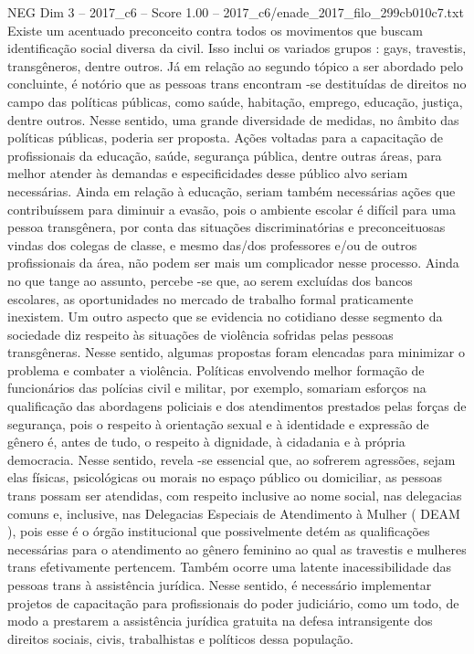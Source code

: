\begin{textsample}{NEG Dim 3 – 2017\_c6 – Score 1.00 – 2017\_c6/enade\_2017\_filo\_299cb010c7.txt}
Existe um acentuado preconceito contra todos os movimentos que buscam identificação social diversa da civil.
Isso inclui os variados grupos : gays, travestis, transgêneros, dentre outros.
Já em relação ao segundo tópico a ser abordado pelo concluinte, é notório que as pessoas trans encontram -se destituídas de direitos no campo das políticas públicas, como saúde, habitação, emprego, educação, justiça, dentre outros.
Nesse sentido, uma grande diversidade de medidas, no âmbito das políticas públicas, poderia ser proposta.
Ações voltadas para a capacitação de profissionais da educação, saúde, segurança pública, dentre outras áreas, para melhor atender às demandas e especificidades desse público alvo seriam necessárias.
Ainda em relação à educação, seriam também necessárias ações que contribuíssem para diminuir a evasão, pois o ambiente escolar é difícil para uma pessoa transgênera, por conta das situações discriminatórias e preconceituosas vindas dos colegas de classe, e mesmo das/dos professores e/ou de outros profissionais da área, não podem ser mais um complicador nesse processo.
Ainda no que tange ao assunto, percebe -se que, ao serem excluídas dos bancos escolares, as oportunidades no mercado de trabalho formal praticamente inexistem.
Um outro aspecto que se evidencia no cotidiano desse segmento da sociedade diz respeito às situações de violência sofridas pelas pessoas transgêneras.
Nesse sentido, algumas propostas foram elencadas para minimizar o problema e combater a violência.
Políticas envolvendo melhor formação de funcionários das polícias civil e militar, por exemplo, somariam esforços na qualificação das abordagens policiais e dos atendimentos prestados pelas forças de segurança, pois o respeito à orientação sexual e à identidade e expressão de gênero é, antes de tudo, o respeito à dignidade, à cidadania e à própria democracia.
Nesse sentido, revela -se essencial que, ao sofrerem agressões, sejam elas físicas, psicológicas ou morais no espaço público ou domiciliar, as pessoas trans possam ser atendidas, com respeito inclusive ao nome social, nas delegacias comuns e, inclusive, nas Delegacias Especiais de Atendimento à Mulher ( DEAM ), pois esse é o órgão institucional que possivelmente detém as qualificações necessárias para o atendimento ao gênero feminino ao qual as travestis e mulheres trans efetivamente pertencem.
Também ocorre uma latente inacessibilidade das pessoas trans à assistência jurídica.
Nesse sentido, é necessário implementar projetos de capacitação para profissionais do poder judiciário, como um todo, de modo a prestarem a assistência jurídica gratuita na defesa intransigente dos direitos sociais, civis, trabalhistas e políticos dessa população.

\end{textsample}
